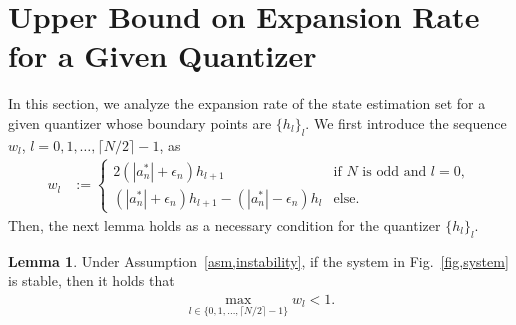 \documentclass[a4paper, 11pt]{article}
\theoremstyle{definition}
\newtheorem{lem}{Lemma}
\newcommand{\fref}[1]{Fig.~\ref{#1}}
\begin{document}
\section{Upper Bound on Expansion Rate for a Given Quantizer}\label{sec,gnec}
In this section, we analyze the expansion rate of the state estimation set
for a given quantizer whose boundary points are $\{h_l\}_l$.
We first introduce the sequence $w_l$, $l=0,1,\dots,\lceil N/2\rceil-1$, as
\begin{align}
  w_{l}&:=
 \begin{cases}
  2(|a_n^*|+\epsilon_n)h_{l+1} & \text{if }N\text{ is odd and }l=0,\\
  (|a_n^*|+\epsilon_n)h_{l+1}-(|a_n^*|-\epsilon_n)h_l  &  \text{else}.
 \end{cases}\label{def,w}
\end{align}
Then, the next lemma holds as a necessary condition for the quantizer
$\{h_l\}_l$.

\begin{lem}\label{lem,generalnec}
 Under Assumption~\ref{asm,instability}, if the system in \fref{fig,system}
is stable, then it holds that
\begin{align}
 \max_{l\in\{0,1,\dots,\lceil N/2\rceil-1\}}w_l<1.\label{lem1,cond}
\end{align}
\end{lem}
\end{document}

